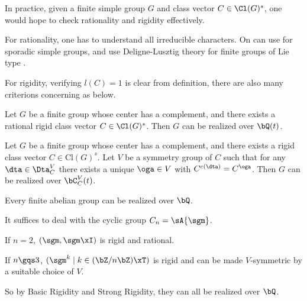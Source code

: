 \documentclass[0-main]{subfiles}
\begin{document}
\begin{rmk}
	In practice, given a finite simple group $G$ and class vector $C\in\Cl(G)^{s}$, one would hope to check rationality and rigidity effectively.

	For rationality, one has to understand all irreducible characters. On can use \cite{CCNPW1985} for sporadic simple groups, and use Deligne-Lusztig theory for finite groups of Lie type \cite{GM2020}.

	For rigidity, verifying $l(C)=1$ is clear from definition, there are also many criterions concerning as below.
\end{rmk}

\begin{thm}
	Let $G$ be a finite group whose center has a complement, and there exists a rational rigid class vector $C\in\Cl(G)^{s}$. Then $G$ can be realized over $\bQ(t)$.
\end{thm}

\begin{thm}
	Let $G$ be a finite group whose center has a complement, and there exists a rigid class vector $C\in \mathrm{Cl}(G)^{s}$. Let $V$ be a symmetry group of $C$ such that for any $\dta\in\Dta_{C}^{V}$ there exists a unique $\oga\in V$ with $C^{c(\dta)}=C^{\oga}$. Then $G$ can be realized over $\bC_{C}^{V}(t)$.
\end{thm}



\begin{thm}[Theorem~5.1]
	Every finite abelian group can be realized over $\bQ$.
\end{thm}

\begin{prf}
	It suffices to deal with the cyclic group $C_{n}=\sA{\sgm}$.
	\begin{itm}
		\item If $n=2$, $(\sgm,\sgm\xI)$ is rigid and rational.
		\item If $n\gqs3$, $(\sgm^{k}\mid k\in(\bZ/n\bZ)\xT)$ is rigid and can be made $V$-symmetric by a suitable choice of $V$.
	\end{itm}
	So by Basic Rigidity and Strong Rigidity, they can all be realized over $\bQ$.
\end{prf}
\end{document}
